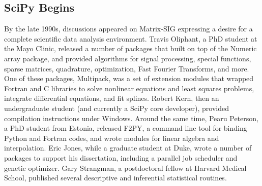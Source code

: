 \documentclass[fleqn,10pt]{wlscirep}
\begin{document}

%




\subsection*{SciPy Begins}

By the late 1990s, discussions appeared on Matrix-SIG
expressing a desire for a complete scientific data analysis environment\cite{Travis-Keynote-2010}.
Travis Oliphant, a PhD student at the Mayo Clinic,
released a number of packages\cite{Travis-some-modules,Travis-enhance}
that built on top of the Numeric array
package, and provided algorithms for signal processing, special
functions, sparse matrices, quadrature, optimization, Fast Fourier
Transforms, and more.  One of these packages, Multipack\cite{multipack}, was a set of
extension modules that wrapped Fortran and C libraries
to solve nonlinear equations and least
squares problems, integrate differential equations, and fit splines.
Robert Kern, then an
undergraduate student (and currently a SciPy core developer), provided
compilation instructions under Windows.
Around the same time, Pearu Peterson, a PhD student from Estonia,
released F2PY\cite{peterson2009f2py}, a command line tool for binding Python and Fortran
codes, and wrote modules for linear algebra and interpolation.
Eric Jones, while a graduate student at Duke, wrote a number of
packages to support his dissertation, including a parallel job
scheduler and genetic optimizer.
%
%
Gary Strangman, a postdoctoral fellow at Harvard Medical School,
published several descriptive and inferential statistical
routines\cite{Strangman-modules}.
\end{document}
